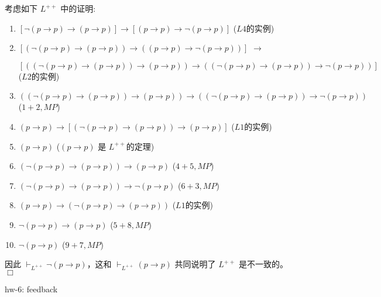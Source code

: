 \documentclass[UTF8,12pt,a4paper]{ctexart}
\begin{document}
考虑如下 $L^{++}$ 中的证明:
\begin{enumerate}
	\item $[\neg (p \to p) \to (p \to p)]   \to [(p \to p) \to \neg (p \to p)]$ 
	\hfill  ($L4$的实例)
	
	\item $[ (\neg (p \to p) \to (p \to p))   \to ((p \to p) \to \neg (p \to p)) ]$ $\to$
	
	$[
	((\neg (p \to p) \to (p \to p)) \to (p \to p) )  \to 
	(
	(\neg (p \to p) \to (p \to p)) \to \neg (p \to p)
	)
	]$
	\hfill  ($L2$的实例)
	
	\item $((\neg (p \to p) \to (p \to p)) \to (p \to p) )  \to 
	(
	(\neg (p \to p) \to (p \to p)) \to \neg (p \to p)
	)$
	\hfill ($1 + 2, MP$)
	
	\item $(p \to p) \to [(\neg (p \to p) \to (p \to p)) \to (p \to p)]$ 
	\hfill ($L1$的实例)
	
	\item $(p \to p) $ 
	\hfill ($(p\to p)$ 是 $L^{++}$的定理)
	
	\item $(\neg (p \to p) \to (p \to p)) \to (p \to p) $
	\hfill ($4+5, MP$)
	
	\item $(\neg (p \to p) \to (p \to p)) \to \neg (p \to p)$
	\hfill ($6+3, MP$)
	
	\item $(p \to p) \to ( \neg (p \to p) \to (p \to p))$ 
	\hfill ($L1$的实例)
	
	\item $ \neg (p \to p) \to (p \to p)$ 
	\hfill ($5+8, MP$)
	
	\item $\neg (p \to p)$
	\hfill ($9+7, MP$)
\end{enumerate}

\noindent 
因此 $\vdash_{L^{++}} \neg (p \to p)$，这和  $\vdash_{L^{++}} (p \to p)$ 共同说明了 $L^{++}$ 是不一致的。
\hfill $\Box$



\vspace{1em}
\dotfill hw-6: feedback
\dotfill
\end{document}
